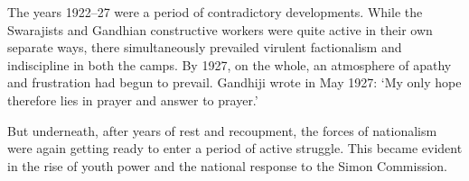 The years 1922--27 were a period of contradictory developments. While the Swarajists and Gandhian constructive workers were quite active in their own separate ways, there simultaneously prevailed virulent factionalism and indiscipline in both the camps. By 1927, on the whole, an atmosphere of apathy and frustration had begun to prevail. Gandhiji wrote in May 1927: `My only hope therefore lies in prayer and answer to prayer.'

But underneath, after years of rest and recoupment, the forces of nationalism were again getting ready to enter a period of active struggle. This became evident in the rise of youth power and the national response to the Simon Commission.
